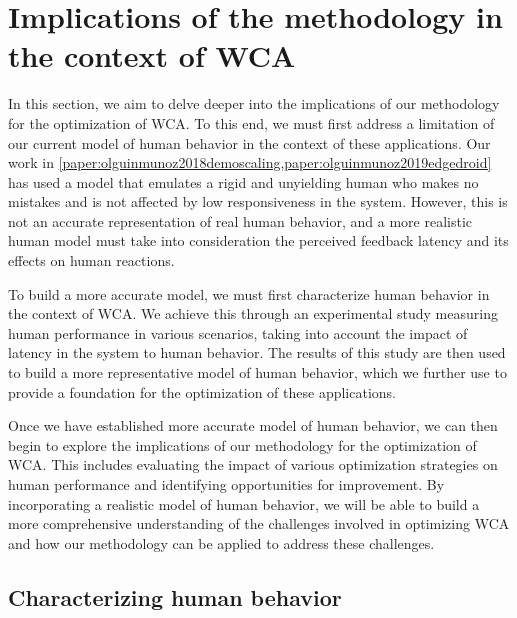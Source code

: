 \section{Implications of the methodology in the context of \acs{WCA}}\label{sec:extendingmethodology}

In this section, we aim to delve deeper into the implications of our methodology for the optimization of \gls{WCA}.
To this end, we must first address a limitation of our current model of human behavior in the context of these applications.
Our work in \cref{paper:olguinmunoz2018demoscaling,paper:olguinmunoz2019edgedroid} has used a model that emulates a rigid and unyielding human who makes no mistakes and is not affected by low responsiveness in the system.
However, this is not an accurate representation of real human behavior, and a more realistic human model must take into consideration the perceived feedback latency and its effects on human reactions.

To build a more accurate model, we must first characterize human behavior in the context of \gls{WCA}.
We achieve this through an experimental study measuring human performance in various scenarios, taking into account the impact of latency in the system to human behavior.
The results of this study are then used to build a more representative model of human behavior, which we further use to provide a foundation for the optimization of these applications.

Once we have established more accurate model of human behavior, we can then begin to explore the implications of our methodology for the optimization of \gls{WCA}.
This includes evaluating the impact of various optimization strategies on human performance and identifying opportunities for improvement.
By incorporating a realistic model of human behavior, we will be able to build a more comprehensive understanding of the challenges involved in optimizing \gls{WCA} and how our methodology can be applied to address these challenges.

\subsection{Characterizing human behavior}

